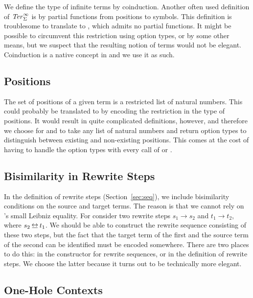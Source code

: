 We define the type of infinite terms by coinduction. Another often
used definition of $\mathit{Ter}_\Sigma^\infty$ is by partial functions from positions to
symbols. This definition is troublesome to translate to \Coq, which
admits no partial functions. It might be possible to circumvent this
restriction using option types, or by some other means, but we suspect
that the resulting notion of terms would not be elegant. Coinduction
is a native concept in \Coq and we use it as such.


\subsection{Positions}

The set of positions of a given term is a restricted list of natural
numbers. This could probably be translated to \Coq by encoding the
restriction in the type of positions. It would result in quite
complicated definitions, however, and therefore we choose for
 and
 to take any list of
natural numbers and return option types to distinguish between
existing and non-existing positions. This comes at the cost of having
to handle the option types with every call of
 or
.


\subsection{Bisimilarity in Rewrite Steps}

In the definition of rewrite steps (Section~\ref{sec:seq}), we include
bisimilarity conditions on the source and target terms. The reason is
that we cannot rely on \Coq's small Leibniz equality. For consider two
rewrite steps $s_1 \to s_2$ and $t_1 \to t_2$, where $s_2 \bis
t_1$. We should be able to construct the rewrite sequence consisting
of these two steps, but the fact that the target term of the first
and the source term of the second can be identified must be encoded
somewhere. There are two places to do this: in the
 constructor
for rewrite sequences, or in the definition of rewrite steps. We
choose the latter because it turns out to be technically more
elegant.


\subsection{One-Hole Contexts}\label{sub:contexts}

